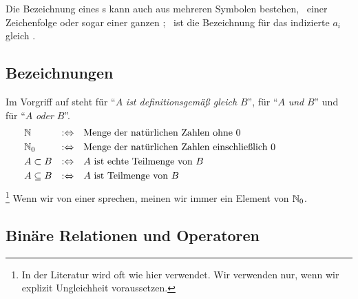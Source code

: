 Die Bezeichnung eines s kann auch aus mehreren Symbolen bestehen, \textdh\ einer Zeichenfolge oder sogar einer ganzen \Formel; \textzB\ ist die Bezeichnung für das indizierte  $a_i$ gleich .

\subsection{Bezeichnungen}%
\label{sub:Bezeichnungen}

Im Vorgriff auf  steht  für \enquote{$A$ \emph{ist definitionsgemäß gleich} $B$},  für \enquote{$A$ \emph{und} $B$} und  für \enquote{$A$ \emph{oder} $B$}.
\begin{align}
	& \mathbb{N}          & :\Leftrightarrow & \quad
	\text{Menge der natürlichen Zahlen ohne           $0$} \\
	& \mathbb{N}_0         & :\Leftrightarrow & \quad
	\text{Menge der natürlichen Zahlen einschließlich $0$} \\
	& A \subset B   & :\Leftrightarrow & \quad
	\text{$A$ ist echte Teilmenge von $B$}                 \\
	& A \subseteq B & :\Leftrightarrow & \quad
	\text{$A$ ist       Teilmenge von $B$}                 &&&&&&&&&&
\end{align}%
\footnote{%
	In der Literatur wird \chrqt{$\subset$} oft wie hier \chrqt{$\subseteq$} verwendet.
	Wir verwenden \chrqt{$\subset$} nur, wenn wir explizit Ungleichheit voraussetzen.
}
Wenn wir von einer  sprechen, meinen wir immer ein Element von $\mathbb{N}_0$.

\subsection{Binäre Relationen und Operatoren}%
\label{sub:binär}
\hidden{\Relation\Operator}

